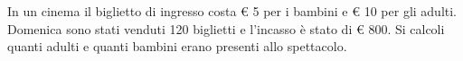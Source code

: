 In un cinema il biglietto di ingresso costa € 5 per i bambini e € 10 per gli adulti. Domenica
sono stati venduti 120 biglietti e l’incasso è stato di € 800. Si calcoli quanti adulti e quanti bambini erano 
presenti allo spettacolo.
